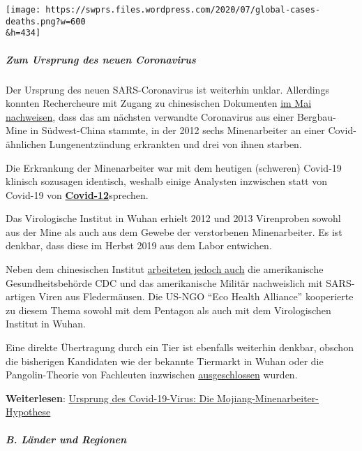 \texttt{[image: https://swprs.files.wordpress.com/2020/07/global-cases-deaths.png?w=600\\\&h=434]}

\hypertarget{zum-ursprung-des-neuen-coronavirus}{%
\subparagraph{\texorpdfstring{\textbf{Zum Ursprung des neuen
Coronavirus}}{Zum Ursprung des neuen Coronavirus}}\label{zum-ursprung-des-neuen-coronavirus}}

Der Ursprung des neuen SARS-Coronavirus ist weiterhin unklar. Allerdings
konnten Rechercheure mit Zugang zu chinesischen Dokumenten
\href{https://swprs.org/ursprung-des-covid-19-virus-die-mojiang-minenarbeiter-hypothese/}{im
Mai nachweisen}, dass das am nächsten verwandte Coronavirus aus einer
Bergbau-Mine in Südwest-China stammte, in der 2012 sechs Minenarbeiter
an einer Covid-ähnlichen Lungenentzündung erkrankten und drei von ihnen
starben.

Die Erkrankung der Minenarbeiter war mit dem heutigen (schweren)
Covid-19 klinisch sozusagen identisch, weshalb einige Analysten
inzwischen statt von Covid-19 von
\href{https://twitter.com/search?q=\%23covid12\&f=live}{\textbf{Covid-12}}sprechen.

Das Virologische Institut in Wuhan erhielt 2012 und 2013 Virenproben
sowohl aus der Mine als auch aus dem Gewebe der verstorbenen
Minenarbeiter. Es ist denkbar, dass diese im Herbst 2019 aus dem Labor
entwichen.

Neben dem chinesischen Institut
\href{https://armswatch.com/project-g-2101-pentagon-biolab-discovered-mers-and-sars-like-coronaviruses-in-bats/}{arbeiteten
jedoch auch} die amerikanische Gesundheits­behörde CDC und das
amerikanische Militär nachweislich mit SARS-artigen Viren aus
Fledermäusen. Die US-NGO ``Eco Health Alliance'' kooperierte zu diesem
Thema sowohl mit dem Pentagon als auch mit dem Virologischen Institut in
Wuhan.

Eine direkte Übertragung durch ein Tier ist ebenfalls weiterhin denkbar,
obschon die bisherigen Kandidaten wie der bekannte Tiermarkt in Wuhan
oder die Pangolin-Theorie von Fachleuten inzwischen
\href{https://www.news-medical.net/news/20200708/Research-sheds-doubt-on-the-Pangolin-link-to-SARS-CoV-2.aspx}{ausgeschlossen}
wurden.

\textbf{Weiterlesen}:
\href{https://swprs.org/ursprung-des-covid-19-virus-die-mojiang-minenarbeiter-hypothese/}{Ursprung
des Covid-19-Virus: Die Mojiang-Minenarbeiter-Hypothese}

\hypertarget{b-luxe4nder-und-regionen}{%
\subparagraph{\texorpdfstring{\textbf{B. Länder und
Regionen}}{B. Länder und Regionen}}\label{b-luxe4nder-und-regionen}}

